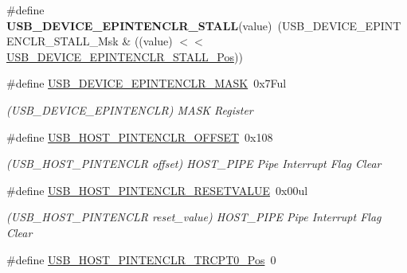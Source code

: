 \begin{DoxyCompactItemize}
\item 
\hypertarget{group___s_a_m_l21___u_s_b_ga5dabf4d55682115d290c2781f31d0760}{}\#define {\bfseries U\+S\+B\+\_\+\+D\+E\+V\+I\+C\+E\+\_\+\+E\+P\+I\+N\+T\+E\+N\+C\+L\+R\+\_\+\+S\+T\+A\+L\+L}(value)~(U\+S\+B\+\_\+\+D\+E\+V\+I\+C\+E\+\_\+\+E\+P\+I\+N\+T\+E\+N\+C\+L\+R\+\_\+\+S\+T\+A\+L\+L\+\_\+\+Msk \& ((value) $<$$<$ \hyperlink{group___s_a_m_l21___u_s_b_ga35b6164a256415dc81652aa38f381584}{U\+S\+B\+\_\+\+D\+E\+V\+I\+C\+E\+\_\+\+E\+P\+I\+N\+T\+E\+N\+C\+L\+R\+\_\+\+S\+T\+A\+L\+L\+\_\+\+Pos}))\label{group___s_a_m_l21___u_s_b_ga5dabf4d55682115d290c2781f31d0760}

\item 
\hypertarget{group___s_a_m_l21___u_s_b_ga4f401cb3488fd905cc6023234168ec4b}{}\#define \hyperlink{group___s_a_m_l21___u_s_b_ga4f401cb3488fd905cc6023234168ec4b}{U\+S\+B\+\_\+\+D\+E\+V\+I\+C\+E\+\_\+\+E\+P\+I\+N\+T\+E\+N\+C\+L\+R\+\_\+\+M\+A\+S\+K}~0x7\+Ful\label{group___s_a_m_l21___u_s_b_ga4f401cb3488fd905cc6023234168ec4b}

\begin{DoxyCompactList}\small\item\em (U\+S\+B\+\_\+\+D\+E\+V\+I\+C\+E\+\_\+\+E\+P\+I\+N\+T\+E\+N\+C\+L\+R) M\+A\+S\+K Register \end{DoxyCompactList}\item 
\hypertarget{group___s_a_m_l21___u_s_b_ga8f316a48734cb1038cf55616ab78cff0}{}\#define \hyperlink{group___s_a_m_l21___u_s_b_ga8f316a48734cb1038cf55616ab78cff0}{U\+S\+B\+\_\+\+H\+O\+S\+T\+\_\+\+P\+I\+N\+T\+E\+N\+C\+L\+R\+\_\+\+O\+F\+F\+S\+E\+T}~0x108\label{group___s_a_m_l21___u_s_b_ga8f316a48734cb1038cf55616ab78cff0}

\begin{DoxyCompactList}\small\item\em (U\+S\+B\+\_\+\+H\+O\+S\+T\+\_\+\+P\+I\+N\+T\+E\+N\+C\+L\+R offset) H\+O\+S\+T\+\_\+\+P\+I\+P\+E Pipe Interrupt Flag Clear \end{DoxyCompactList}\item 
\hypertarget{group___s_a_m_l21___u_s_b_gae6db98830ccbf80ee18667908208a649}{}\#define \hyperlink{group___s_a_m_l21___u_s_b_gae6db98830ccbf80ee18667908208a649}{U\+S\+B\+\_\+\+H\+O\+S\+T\+\_\+\+P\+I\+N\+T\+E\+N\+C\+L\+R\+\_\+\+R\+E\+S\+E\+T\+V\+A\+L\+U\+E}~0x00ul\label{group___s_a_m_l21___u_s_b_gae6db98830ccbf80ee18667908208a649}

\begin{DoxyCompactList}\small\item\em (U\+S\+B\+\_\+\+H\+O\+S\+T\+\_\+\+P\+I\+N\+T\+E\+N\+C\+L\+R reset\+\_\+value) H\+O\+S\+T\+\_\+\+P\+I\+P\+E Pipe Interrupt Flag Clear \end{DoxyCompactList}\item 
\hypertarget{group___s_a_m_l21___u_s_b_gafac89e47191cfdf2ffe2e994a2ff5924}{}\#define \hyperlink{group___s_a_m_l21___u_s_b_gafac89e47191cfdf2ffe2e994a2ff5924}{U\+S\+B\+\_\+\+H\+O\+S\+T\+\_\+\+P\+I\+N\+T\+E\+N\+C\+L\+R\+\_\+\+T\+R\+C\+P\+T0\+\_\+\+Pos}~0\label{group___s_a_m_l21___u_s_b_gafac89e47191cfdf2ffe2e994a2ff5924}


\end{DoxyCompactItemize}

